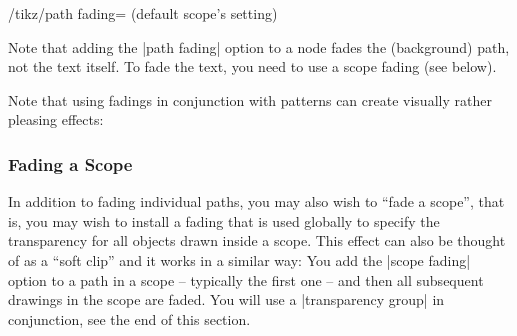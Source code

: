 \begin{key}{/tikz/path fading= (default \normalfont scope's setting)}
\begin{codeexample}[preamble={\usetikzlibrary{fadings,patterns}},pre={\begin{lateximage}},post={\end{lateximage}},svg]
\end{codeexample}

    Note that adding the |path fading| option to a node fades the (background)
    path, not the text itself. To fade the text, you need to use a scope fading
    (see below).
\end{key}

Note that using fadings in conjunction with patterns can create visually rather
pleasing effects:
%
\begin{codeexample}[preamble={\usetikzlibrary{fadings,patterns,shadows}},pre={\begin{lateximage}},post={\end{lateximage}}]
\tikzfading[name=middle,
            top color=transparent!50,
            bottom color=transparent!50,
            middle color=transparent!20]
\end{codeexample}


\subsubsection{Fading a Scope}

In addition to fading individual paths, you may also wish to ``fade a scope'',
that is, you may wish to install a fading that is used globally to specify the
transparency for all objects drawn inside a scope. This effect can also be
thought of as a ``soft clip'' and it works in a similar way: You add the
|scope fading| option to a path in a scope -- typically the first one -- and
then all subsequent drawings in the scope are faded. You will use a
|transparency group| in conjunction, see the end of this section.

